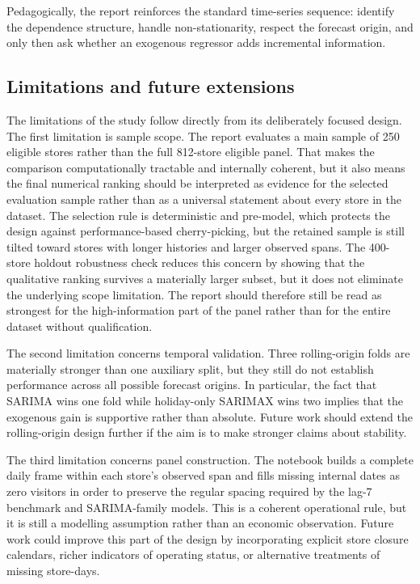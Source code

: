 \documentclass[11pt,oneside]{scrartcl}
\begin{document}
Pedagogically, the report reinforces the standard time-series sequence: identify the dependence structure, handle non-stationarity, respect the forecast origin, and only then ask whether an exogenous regressor adds incremental information.

\subsection{Limitations and future extensions}
The limitations of the study follow directly from its deliberately focused design. The first limitation is sample scope. The report evaluates a main sample of 250 eligible stores rather than the full 812-store eligible panel. That makes the comparison computationally tractable and internally coherent, but it also means the final numerical ranking should be interpreted as evidence for the selected evaluation sample rather than as a universal statement about every store in the dataset. The selection rule is deterministic and pre-model, which protects the design against performance-based cherry-picking, but the retained sample is still tilted toward stores with longer histories and larger observed spans. The 400-store holdout robustness check reduces this concern by showing that the qualitative ranking survives a materially larger subset, but it does not eliminate the underlying scope limitation. The report should therefore still be read as strongest for the high-information part of the panel rather than for the entire dataset without qualification.

The second limitation concerns temporal validation. Three rolling-origin folds are materially stronger than one auxiliary split, but they still do not establish performance across all possible forecast origins. In particular, the fact that SARIMA wins one fold while holiday-only SARIMAX wins two implies that the exogenous gain is supportive rather than absolute. Future work should extend the rolling-origin design further if the aim is to make stronger claims about stability.

The third limitation concerns panel construction. The notebook builds a complete daily frame within each store's observed span and fills missing internal dates as zero visitors in order to preserve the regular spacing required by the lag-7 benchmark and SARIMA-family models. This is a coherent operational rule, but it is still a modelling assumption rather than an economic observation. Future work could improve this part of the design by incorporating explicit store closure calendars, richer indicators of operating status, or alternative treatments of missing store-days.
\end{document}
